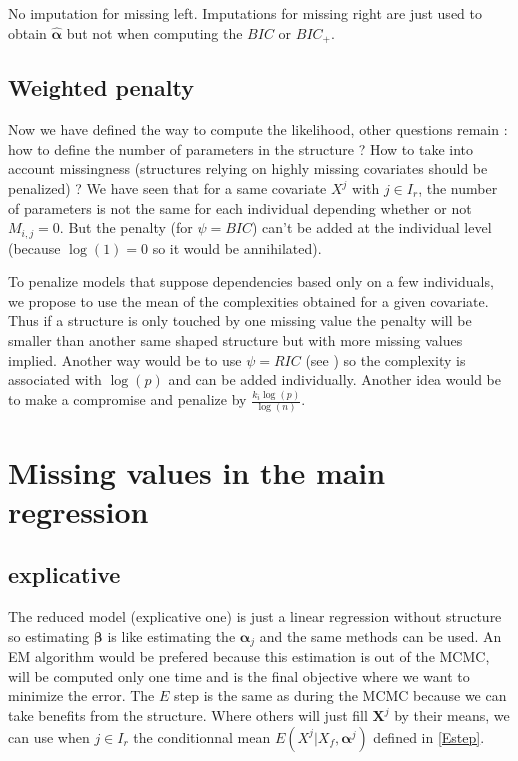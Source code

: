 \documentclass[11pt,a4paper]{report}
\begin{document}
			No imputation for missing left. Imputations for missing right are just used to obtain $\hat{\boldsymbol{\alpha}}$ but not when computing the $BIC$ or $BIC_+$.
			
		\subsection{Weighted penalty}
			Now we have defined the way to compute the likelihood, other questions remain : how to define the number of parameters in the structure ?		How to take into account missingness (structures relying on highly missing covariates should be penalized) ?
			We have seen that for a same covariate $X^j$ with $ j \in I_r$, the number of parameters is not the same for each individual depending whether or not $M_{i,j}=0$. But the penalty (for $\psi=BIC$) can't be added at the individual level (because $\log(1)=0$ so it would be annihilated). 
			
			To penalize models that suppose dependencies based only on a few individuals, we propose to use the mean of the complexities obtained for a given covariate. Thus if a structure is only touched by one missing value the penalty will be smaller than another same shaped structure but with more missing values implied.
			Another way would be to use $\psi=RIC$ (see \cite{foster1994risk}) so the complexity is associated with $\log(p)$ and can be added individually. Another idea would be to make a compromise and penalize by $\frac{k_i\log(p)}{\log(n)}$.
		
%	
					
			
			
	\section{Missing values in the main regression}
		\subsection{explicative}
			The reduced model (explicative one) is just a linear regression without structure so estimating $\boldsymbol{\beta}$ is like estimating the $\boldsymbol{\alpha}_j$ and the same methods can be used. An EM algorithm would be prefered because this estimation is out of the MCMC, will be computed only one time and is the final objective where we want to minimize the error.
			The $E$ step is the same as during the MCMC because we can take benefits from the structure. Where others will just fill $\boldsymbol{X}^j$ by their means, we can use when $j\in I_r$ the conditionnal mean $E(X^j|X_f,\boldsymbol{\alpha}^j)$ defined in \ref{Estep}.
			
\end{document}
